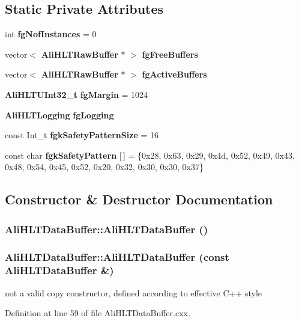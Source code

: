 \subsection*{Static Private Attributes}
\begin{CompactItemize}
\item 
int {\bf fg\-Nof\-Instances} = 0
\item 
vector$<$ {\bf Ali\-HLTRaw\-Buffer} $\ast$ $>$ {\bf fg\-Free\-Buffers}
\item 
vector$<$ {\bf Ali\-HLTRaw\-Buffer} $\ast$ $>$ {\bf fg\-Active\-Buffers}
\item 
{\bf Ali\-HLTUInt32\_\-t} {\bf fg\-Margin} = 1024
\item 
{\bf Ali\-HLTLogging} {\bf fg\-Logging}
\item 
const Int\_\-t {\bf fgk\-Safety\-Pattern\-Size} = 16
\item 
const char {\bf fgk\-Safety\-Pattern} [$\,$] = \{0x28, 0x63, 0x29, 0x4d, 0x52, 0x49, 0x43, 0x48, 0x54, 0x45, 0x52, 0x20, 0x32, 0x30, 0x30, 0x37\}
\end{CompactItemize}


\subsection{Constructor \& Destructor Documentation}
\subsubsection{\setlength{\rightskip}{0pt plus 5cm}Ali\-HLTData\-Buffer::Ali\-HLTData\-Buffer ()}\label{classAliHLTDataBuffer_a0}


\subsubsection{\setlength{\rightskip}{0pt plus 5cm}Ali\-HLTData\-Buffer::Ali\-HLTData\-Buffer (const {\bf Ali\-HLTData\-Buffer} \&)}\label{classAliHLTDataBuffer_a1}


not a valid copy constructor, defined according to effective C++ style 

Definition at line 59 of file Ali\-HLTData\-Buffer.cxx.

